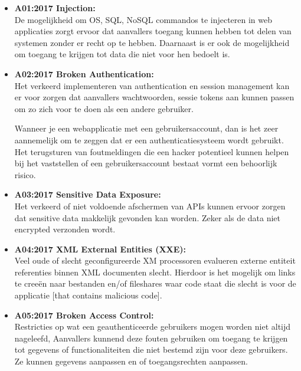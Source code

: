 \begin{itemize}


\item \textbf{A01:2017 Injection:} \\De mogelijkheid om OS, SQL, NoSQL commandos te injecteren in web applicaties zorgt ervoor dat aanvallers toegang kunnen hebben tot delen van systemen zonder er recht op te hebben. Daarnaast is er ook de mogelijkheid om toegang te krijgen tot data die niet voor hen bedoelt is.
\item \textbf{A02:2017 Broken Authentication:}\\ Het verkeerd implementeren van authentication en session management kan er voor zorgen dat aanvallers wachtwoorden, sessie tokens aan kunnen passen om zo zich voor te doen als een andere gebruiker.

Wanneer je een webapplicatie met een gebruikersaccount, dan is het zeer aannemelijk om te zeggen dat er een authenticatiesysteem wordt gebruikt. Het terugsturen van foutmeldingen die een hacker potentieel kunnen helpen bij het vaststellen of een gebruikersaccount bestaat vormt een behoorlijk risico.


\item \textbf{A03:2017 Sensitive Data Exposure:}\\
Het verkeerd of niet voldoende afschermen van APIs kunnen ervoor zorgen dat sensitive data makkelijk gevonden kan worden. Zeker als de data niet encrypted verzonden wordt.

\item \textbf{A04:2017 XML External Entities (XXE):}\\
Veel oude of slecht geconfigureerde XM processoren evalueren externe entiteit referenties binnen XML documenten slecht. Hierdoor is het mogelijk om links te cree\"en naar bestanden en/of fileshares waar code staat die slecht is voor de applicatie [that contains malicious code].

\item \textbf{A05:2017 Broken Access Control:}\\
Restricties op wat een geauthenticeerde gebruikers mogen worden niet altijd nageleefd, Aanvallers kunnend deze fouten gebruiken om toegang te krijgen tot gegevens of functionaliteiten die niet bestemd zijn voor deze gebruikers. Ze kunnen gegevens aanpassen en of toegangsrechten aanpassen.


\end{itemize}
